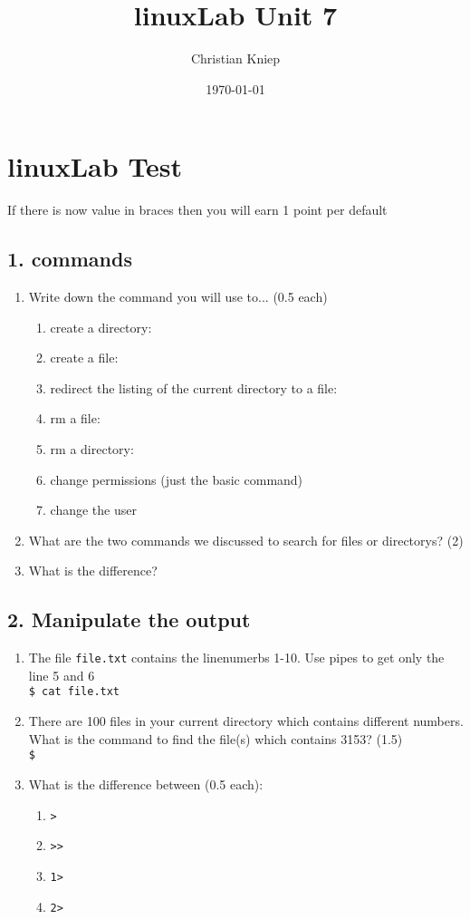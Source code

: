 \documentclass[11pt]{article}
\author{Christian Kniep}
\title{linuxLab Unit 7}
\date{\today}
\begin{document}
\maketitle
\section*{linuxLab Test}
If there is now value in braces then you will earn 1 point per default
\subsection*{1. commands}
\begin{enumerate}
    \item Write down the command you will use to... (0.5 each)
    \begin{enumerate}
        \item create a directory:
        \item create a file:
        \item redirect the listing of the current directory to a file:\\
        \item rm a file:
        \item rm a directory:
        \item change permissions (just the basic command)
        \item change the user
    \end{enumerate}
    \item What are the two commands we discussed to search for files or directorys? (2)
    \item What is the difference?
\end{enumerate}
\newpage
\subsection*{2. Manipulate the output}
\begin{enumerate}
    \item The file \texttt{file.txt} contains the linenumerbs 1-10. Use pipes to get only the line 5 and 6 \\
    \texttt{\$ cat file.txt}
    \item There are 100 files in your current directory which contains different numbers. What is the command to find the file(s) which contains 3153? (1.5)\\
    \texttt{\$}
    \item What is the difference between (0.5 each):
    \begin{enumerate}
        \item \texttt{\textgreater}
        \item \texttt{\textgreater\textgreater}
        \item \texttt{1\textgreater}
        \item \texttt{2\textgreater}
    \end{enumerate}
\end{enumerate}
\newpage
\end{document}

